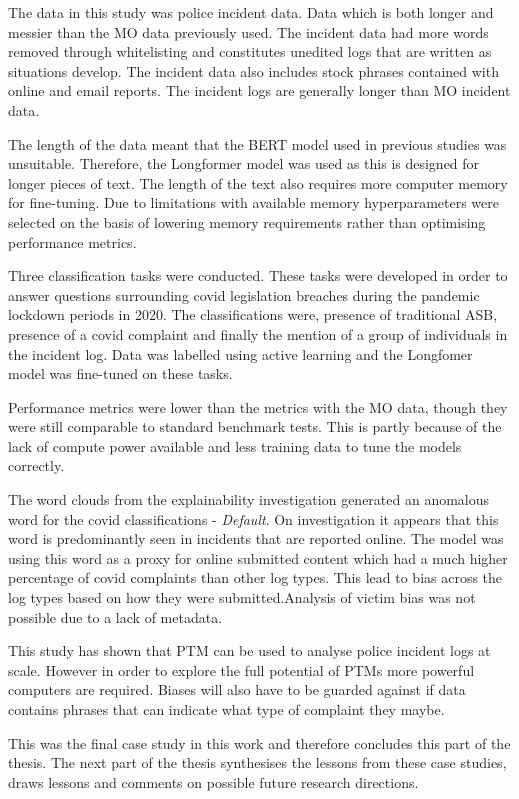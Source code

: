 The data in this study was police incident data. Data which is both longer and messier than the MO data previously used. The incident data had more words removed through whitelisting and constitutes unedited logs that are written as situations develop. The incident data also includes stock phrases contained with online and email reports. The incident logs are generally longer than MO incident data.

The length of the data meant that the BERT model used in previous studies was unsuitable. Therefore, the Longformer model was used as this is designed for longer pieces of text. The length of the text also requires more computer memory for fine-tuning. Due to limitations with  available memory hyperparameters were selected on the basis of lowering memory requirements rather than optimising performance metrics.

Three classification tasks were conducted. These tasks were developed in order to answer questions surrounding covid legislation breaches during the pandemic lockdown periods in 2020. The classifications were, presence of traditional ASB, presence of a covid complaint and finally the mention of a group of individuals in the incident log. Data was labelled using active learning and the Longfomer model was fine-tuned on these tasks.

Performance metrics were lower than the metrics with the MO data, though they were still comparable to standard benchmark tests. This is partly because of the lack of compute power available  and less training data to tune the models correctly.

The word clouds from the explainability investigation generated an anomalous word for the covid classifications - \emph{Default}. On investigation it appears that this word is predominantly seen in incidents that are reported online. The model was using this word as a proxy for online submitted content which had a much higher percentage of covid complaints than other log types. This lead to bias across the log types based on how they were submitted.Analysis of victim bias was not possible due to a lack of metadata. 


This study has shown that PTM can be used to analyse police incident logs at scale. However in order to explore the full potential of PTMs more powerful computers are required. Biases will also have to be guarded against if data contains phrases that can indicate what type of complaint they maybe.

This was the final case study in this work and therefore concludes this part of the thesis. The next part of the thesis synthesises the lessons from these case studies, draws lessons and comments on possible future research directions.
 


